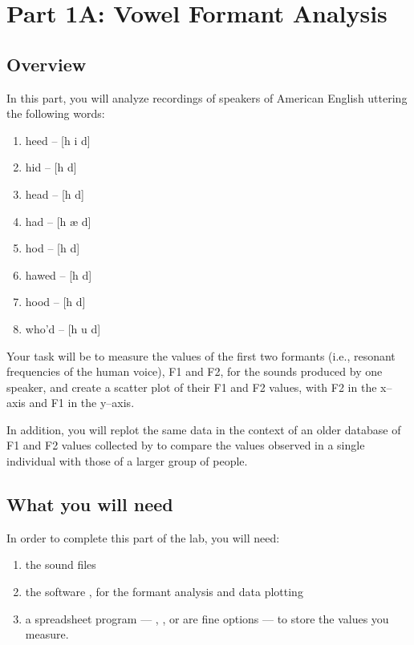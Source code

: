 \section{Part 1A: Vowel Formant Analysis}

\subsection{Overview}

In this part, you will analyze recordings of speakers of American English uttering the following words:

\begin{enumerate}
\item heed -- [h i\textlengthmark{} d]
\item hid -- [h \textsci{} d]
\item head -- [h \textepsilon{} d] 
\item had -- [h \ae{} d]
\item hod -- [h \textscripta\textlengthmark{} d]
\item hawed -- [h \textopeno\textlengthmark{} d]
\item hood -- [h \textupsilon{} d]
\item who'd -- [h u\textlengthmark{} d]
\end{enumerate}

Your task will be to measure the values of the first two formants (i.e., resonant frequencies of the human voice), F1 and F2, for the sounds produced by one speaker, and create a scatter plot of their F1 and F2 values, with F2 in the x--axis and F1 in the y--axis.

In addition, you will replot the same data in the context of an older database of F1 and F2 values collected by  to compare the values observed in a single individual with those of a larger group of people.

\subsection{What you will need}

In order to complete this part of the lab, you will need:

\begin{enumerate}
\item the sound files
\item the software \Praat{}, for the formant analysis and data plotting
\item a spreadsheet program --- \Gsheet{}, \MSExcel{}, or \OpOff{} are fine options --- to store the values you measure.
\end{enumerate}

